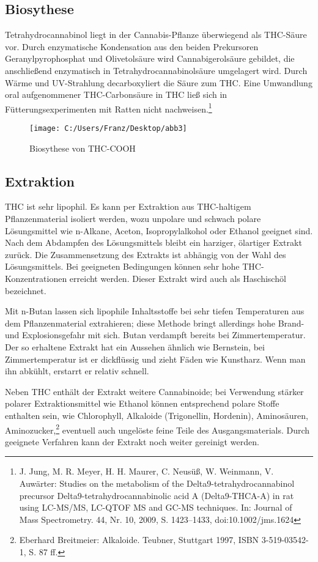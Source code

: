 \documentclass[openany]{scrbook}
\begin{document}
\subsection{Biosythese}
	Tetrahydrocannabinol liegt in der Cannabis-Pflanze überwiegend als THC-Säure vor. Durch enzymatische Kondensation aus den beiden Prekursoren Geranylpyrophosphat und Olivetolsäure wird Cannabigerolsäure gebildet, die anschließend enzymatisch in Tetrahydrocannabinolsäure umgelagert wird. Durch Wärme und UV-Strahlung decarboxyliert die Säure zum THC. Eine Umwandlung oral aufgenommener THC-Carbonsäure in THC ließ sich in Fütterungsexperimenten mit Ratten nicht nachweisen.\footnote[2]{J. Jung, M. R. Meyer, H. H. Maurer, C. Neusüß, W. Weinmann, V. Auwärter: Studies on the metabolism of the Delta9-tetrahydrocannabinol precursor Delta9-tetrahydrocannabinolic acid A (Delta9-THCA-A) in rat using LC-MS/MS, LC-QTOF MS and GC-MS techniques. In: Journal of Mass Spectrometry. 44, Nr. 10, 2009, S. 1423–1433, doi:10.1002/jms.1624}
	
\begin{figure}[h]
	\centering
	\texttt{[image: C:/Users/Franz/Desktop/abb3]}
	\caption{Biosythese von THC-COOH}
	\label{fig:800px-THC_biosynthesis}
\end{figure}

\subsection{Extraktion}
	THC ist sehr lipophil. Es kann per Extraktion aus THC-haltigem Pflanzenmaterial isoliert werden, wozu unpolare und schwach polare Lösungsmittel wie n-Alkane, Aceton, Isopropylalkohol oder Ethanol geeignet sind. Nach dem Abdampfen des Lösungsmittels bleibt ein harziger, ölartiger Extrakt zurück. Die Zusammensetzung des Extrakts ist abhängig von der Wahl des Lösungsmittels. Bei geeigneten Bedingungen können sehr hohe THC-Konzentrationen erreicht werden. Dieser Extrakt wird auch als Haschischöl bezeichnet.
	
	Mit n-Butan lassen sich lipophile Inhaltsstoffe bei sehr tiefen Temperaturen aus dem Pflanzenmaterial extrahieren; diese Methode bringt allerdings hohe Brand- und Explosionsgefahr mit sich. Butan verdampft bereits bei Zimmertemperatur. Der so erhaltene Extrakt hat ein Aussehen ähnlich wie Bernstein, bei Zimmertemperatur ist er dickflüssig und zieht Fäden wie Kunstharz. Wenn man ihn abkühlt, erstarrt er relativ schnell.
	
	Neben THC enthält der Extrakt weitere Cannabinoide; bei Verwendung stärker polarer Extraktionsmittel wie Ethanol können entsprechend polare Stoffe enthalten sein, wie Chlorophyll, Alkaloide (Trigonellin, Hordenin), Aminosäuren, Aminozucker,\footnote[3]{ Eberhard Breitmeier: Alkaloide. Teubner, Stuttgart 1997, ISBN 3-519-03542-1, S. 87 ff.} eventuell auch ungelöste feine Teile des Ausgangsmaterials. Durch geeignete Verfahren kann der Extrakt noch weiter gereinigt werden.
	
\end{document}
